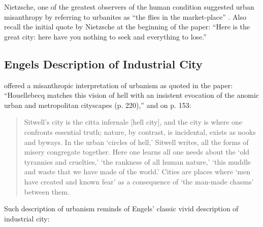 \documentclass[11pt, letterpaper]{article}
\begin{document}
\begin{spacing}{1.4}
Nietzsche, one of the greatest observers of the human condition suggested urban
misanthropy by referring %
 to urbanites as ``the flies in the market-place'' \citep{nietzsche05}. Also
 recall the initial quote by Nietzsche at the beginning of the paper: ``Here
 is the great city: here have you nothing to seek and everything to lose.''


\subsection{Engels Description of Industrial City}   

\citet{gibson17} offered a misanthropic interpretation of urbanism  as quoted in
 the paper: ``Houellebecq matches this vision of hell with an
insistent evocation of the anomic urban and metropolitan cityscapes (p. 220),'' and on p. 153:

\begin{quote}
  Sitwell's city is the citta infernale [hell city], and the city is where one confronts essential truth; nature, by contrast, is incidental, exists as nooks and byways. In the urban `circles of hell,' Sitwell writes, all the forms of misery congregate together.  Here one learns all one needs about the `old tyrannies and cruelties,' `the rankness of all human nature,' `this muddle and waste that we have made of the world.' Cities are places where `men have created and known fear' as a consequence of `the man-made chasms' between them.
\end{quote}


Such description of urbanism reminds of Engels' classic vivid description
of industrial city:


\end{spacing}
\end{document}
